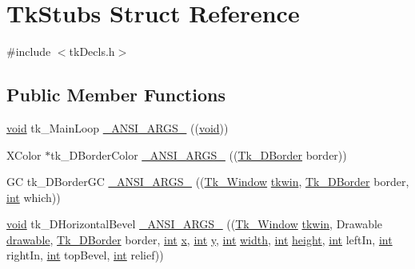 \hypertarget{struct_tk_stubs}{}\section{Tk\+Stubs Struct Reference}
\label{struct_tk_stubs}


{\ttfamily \#include $<$tk\+Decls.\+h$>$}

\subsection*{Public Member Functions}
\begin{DoxyCompactItemize}
\item 
\hyperlink{tk_8h_aba408b7cd755a96426e004c015f5de8e}{void} tk\+\_\+\+Main\+Loop \hyperlink{struct_tk_stubs_a1b0b6656fc34138c9365eb1f7bc58784}{\+\_\+\+A\+N\+S\+I\+\_\+\+A\+R\+G\+S\+\_\+} ((\hyperlink{tk_8h_aba408b7cd755a96426e004c015f5de8e}{void}))
\item 
X\+Color $\ast$tk\+\_\+D\+Border\+Color \hyperlink{struct_tk_stubs_a749fd3feac065e84dc5d5b15d88f1073}{\+\_\+\+A\+N\+S\+I\+\_\+\+A\+R\+G\+S\+\_\+} ((\hyperlink{tk_8h_a7691523098431859a6f7514f1422e545}{Tk\+\_\+D\+Border} border))
\item 
GC tk\+\_\+D\+Border\+GC \hyperlink{struct_tk_stubs_a60456059e4fdbc38c909f3e8bcd4f7bc}{\+\_\+\+A\+N\+S\+I\+\_\+\+A\+R\+G\+S\+\_\+} ((\hyperlink{tk_8h_ab756137de3ee74edc2501bd0d761e37c}{Tk\+\_\+\+Window} \hyperlink{tk_8h_a35df722e7e1b6efd651683b8be7c1490}{tkwin}, \hyperlink{tk_8h_a7691523098431859a6f7514f1422e545}{Tk\+\_\+D\+Border} border, \hyperlink{tk_8h_a83f82f76e7fed06f4c49d2db94028a6d}{int} which))
\item 
\hyperlink{tk_8h_aba408b7cd755a96426e004c015f5de8e}{void} tk\+\_\+D\+Horizontal\+Bevel \hyperlink{struct_tk_stubs_abf7dd622ba8315a9b3f4a2d533eca442}{\+\_\+\+A\+N\+S\+I\+\_\+\+A\+R\+G\+S\+\_\+} ((\hyperlink{tk_8h_ab756137de3ee74edc2501bd0d761e37c}{Tk\+\_\+\+Window} \hyperlink{tk_8h_a35df722e7e1b6efd651683b8be7c1490}{tkwin}, Drawable \hyperlink{tk_8h_aa51f8466cbc86ba8ba27b8e32a0361c7}{drawable}, \hyperlink{tk_8h_a7691523098431859a6f7514f1422e545}{Tk\+\_\+D\+Border} border, \hyperlink{tk_8h_a83f82f76e7fed06f4c49d2db94028a6d}{int} \hyperlink{tk_8h_a61ebd54d47cc56787649a3b8f126bda1}{x}, \hyperlink{tk_8h_a83f82f76e7fed06f4c49d2db94028a6d}{int} \hyperlink{tk_8h_a40f4f3601c0eaa8ca46b1a164264696d}{y}, \hyperlink{tk_8h_a83f82f76e7fed06f4c49d2db94028a6d}{int} \hyperlink{tk_8h_a29e50a5401c1396b3a2aa3487f74d468}{width}, \hyperlink{tk_8h_a83f82f76e7fed06f4c49d2db94028a6d}{int} \hyperlink{tk_8h_a67be2f4b9d9c5b3559139bfb072e2e81}{height}, \hyperlink{tk_8h_a83f82f76e7fed06f4c49d2db94028a6d}{int} left\+In, \hyperlink{tk_8h_a83f82f76e7fed06f4c49d2db94028a6d}{int} right\+In, \hyperlink{tk_8h_a83f82f76e7fed06f4c49d2db94028a6d}{int} top\+Bevel, \hyperlink{tk_8h_a83f82f76e7fed06f4c49d2db94028a6d}{int} relief))

\end{DoxyCompactItemize}
